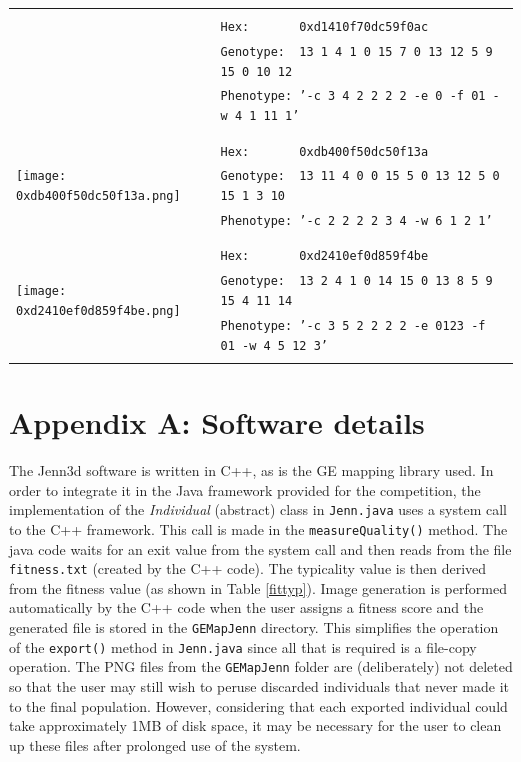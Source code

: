 \documentclass{article}
\begin{document}
\begin{center}
\begin{table}[h!!t]
\begin{tabular}{|l|l|}
		& \\
		& \texttt{Hex:\ \ \ \ \ \ \ 0xd1410f70dc59f0ac}\\
		& \texttt{Genotype:\ \ 13 1 4 1 0 15 7 0 13 12 5 9 15 0 10 12}\\
		& \texttt{Phenotype:\ '-c 3 4 2 2 2 2  -e 0 -f 01 -w 4 1 11 1'}\\
		& \\
		\hline
		\multirow{5}{*}{\texttt{[image: 0xdb400f50dc50f13a.png]}}
		& \\
		& \texttt{Hex:\ \ \ \ \ \ \ 0xdb400f50dc50f13a}\\
		& \texttt{Genotype:\ \ 13 11 4 0 0 15 5 0 13 12 5 0 15 1 3 10}\\
		& \texttt{Phenotype:\ '-c 2 2 2 2 3 4 -w 6 1 2 1'}\\
		& \\
		\hline
		\multirow{5}{*}{\texttt{[image: 0xd2410ef0d859f4be.png]}}
		& \\
		& \texttt{Hex:\ \ \ \ \ \ \ 0xd2410ef0d859f4be}\\
		& \texttt{Genotype:\ \ 13 2 4 1 0 14 15 0 13 8 5 9 15 4 11 14}\\
		& \texttt{Phenotype:\ '-c 3 5 2 2 2 2  -e 0123 -f 01 -w 4 5 12 3'}\\
		& \\
		\hline
	\end{tabular}
	\label{projparams}
	\end{table}
\end{center}




\section*{Appendix A: Software details}

The Jenn3d software is written in C++, as is the GE mapping library used. In
order to integrate it in the Java framework provided for the competition, the
implementation of the \textit{Individual} (abstract) class in \texttt{Jenn.java} uses 
a system call to the C++ framework. This call is made in the \texttt{measureQuality()} 
method. The java code waits for an exit value from the system call and then reads 
from the file \texttt{fitness.txt} (created by the C++ code). The typicality value is then 
derived from the fitness value (as shown in Table \ref{fittyp}). Image generation is 
performed automatically by the C++ code when the user assigns a fitness score and the generated
file is stored in the \texttt{GEMapJenn} directory. This simplifies the operation of the
\texttt{export()} method in \texttt{Jenn.java} since all that is required is a file-copy
operation. The PNG files from the \texttt{GEMapJenn} folder are (deliberately) not deleted so 
that the user may still wish to peruse discarded individuals that never made it to the final population.
However, considering that each exported individual could take approximately 1MB of disk space, it 
may be necessary for the user to clean up these files after prolonged use of the system.
\end{document}
